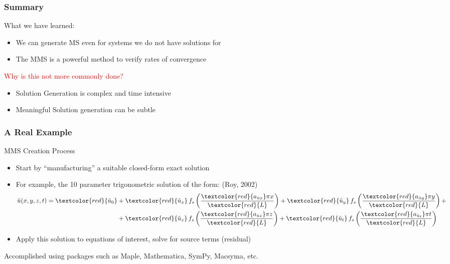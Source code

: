 \documentclass[mathserif]{beamer}
\newcommand{\ms}{\hat{u}}
\begin{document}
\begin{frame}
 \frametitle{Summary}
  \begin{block}{What we have learned:}  
   \begin{itemize}
    \item We can generate MS even for systems we do not have solutions for
    \item The MMS is a powerful method to verify rates of convergence
    \end{itemize}
  \end{block}
  \begin{block}{\textcolor{red}{Why is this not more commonly done?}}
   \begin{itemize}
    \item Solution Generation is complex and time intensive
    \item Meaningful Solution generation can be subtle
    \end{itemize}
  \end{block}


\end{frame}

\begin{frame}
  \frametitle{A Real Example}
  \begin{block}{MMS Creation Process}
    \begin{itemize} 
      \small
      \item Start by ``manufacturing'' a suitable closed-form exact solution
      \item For example, the 10 parameter trigonometric solution of the form: 
        \newline(Roy, 2002)
        \small
        \begin{equation}
          \begin{split}
            \nonumber
            \ms (x,y,z,t) = \textcolor{red}{\ms_0}  &+  \textcolor{red}{\ms_x}\, f_s \left(\frac{\textcolor{red}{a_{\ms x}} \pi x}{\textcolor{red}{L}} \right) +  \textcolor{red}{\ms_y} \,f_s\left(\frac{\textcolor{red}{a_{\ms y}} \pi y}{\textcolor{red}{L}}\right) +\\
            & +  \textcolor{red}{\ms_z} \,f_s\left(\frac{\textcolor{red}{a_{\ms z}} \pi z}{\textcolor{red}{L}}\right)+ \textcolor{red}{\ms_t} \,f_s\left(\frac{\textcolor{red}{a_{\ms_t}} \pi t}{\textcolor{red}{L}}\right)
          \end{split}
        \end{equation}
        \normalsize
      \item Apply this solution to equations of interest, solve for source terms (residual)
    \end{itemize}
  \end{block}  
  \normalsize
  Accomplished using packages such as Maple, Mathematica, SymPy,
 Macsyma, etc.
\end{frame}
\end{document}
